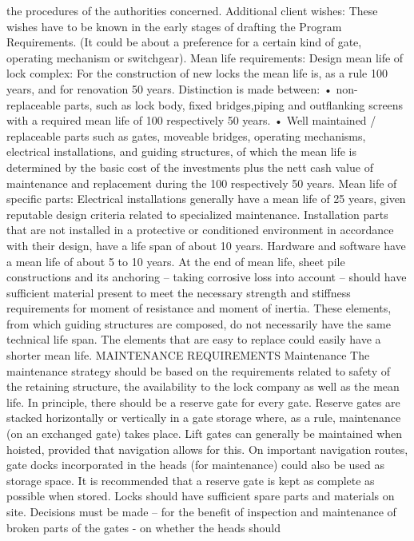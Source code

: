the procedures of the authorities concerned.
Additional client wishes:
These wishes have to be known in the early stages of drafting the
Program Requirements. (It could be about a preference for a certain
kind of gate, operating mechanism or switchgear).
Mean life requirements:
Design mean life of lock complex:
For the construction of new locks the mean life is, as a rule 100
years, and for renovation 50 years. Distinction is made between:
• non-replaceable parts, such as lock body, fixed bridges,piping
and outflanking screens with a required mean life of 100 respectively
50 years.
• Well maintained / replaceable parts such as gates, moveable
bridges, operating mechanisms, electrical installations, and guiding
structures, of which the mean life is determined by the basic
cost of the investments plus the nett cash value of maintenance
and replacement during the 100 respectively 50 years.
Mean life of specific parts:
Electrical installations generally have a mean life of 25 years,
given reputable design criteria related to specialized maintenance.
Installation parts that are not installed in a protective or conditioned
environment in accordance with their design, have a life span of
about 10 years.
Hardware and software have a mean life of about 5 to 10 years.
At the end of mean life, sheet pile constructions and its
anchoring – taking corrosive loss into account – should have sufficient
material present to meet the necessary strength and stiffness
requirements for moment of resistance and moment of inertia.
These elements, from which guiding structures are composed,
do not necessarily have the same technical life span. The elements
that are easy to replace could easily have a shorter mean life.
MAINTENANCE REQUIREMENTS
Maintenance
The maintenance strategy should be based on the requirements
related to safety of the retaining structure, the availability to the
lock company as well as the mean life.
In principle, there should be a reserve gate for every gate.
Reserve gates are stacked horizontally or vertically in a gate storage
where, as a rule, maintenance (on an exchanged gate) takes place.
Lift gates can generally be maintained when hoisted, provided that
navigation allows for this. On important navigation routes, gate
docks incorporated in the heads (for maintenance) could also be
used as storage space. It is recommended that a reserve gate is
kept as complete as possible when stored.
Locks should have sufficient spare parts and materials on site.
Decisions must be made – for the benefit of inspection and maintenance
of broken parts of the gates - on whether the heads should
